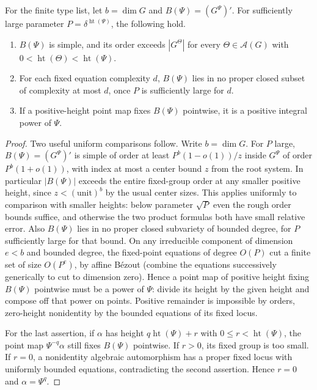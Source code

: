 \begin{lemma}\label{w:height-rigidity}
For the finite type list, let $b=\dim G$ and $B(\Psi)=(G^\Psi)'$. For sufficiently large parameter $P=\delta^{\operatorname{ht}(\Psi)}$, the following hold.
\begin{enumerate}
\item $B(\Psi)$ is simple, and its order exceeds $|G^\Theta|$ for every $\Theta\in\mathcal A(G)$ with $0<\operatorname{ht}(\Theta)<\operatorname{ht}(\Psi)$.
\item For each fixed equation complexity $d$, $B(\Psi)$ lies in no proper closed subset of complexity at most $d$, once $P$ is sufficiently large for $d$.
\item If a positive-height point map fixes $B(\Psi)$ pointwise, it is a positive integral power of $\Psi$.
\end{enumerate}
\end{lemma}
\begin{proof}
Two useful uniform comparisons follow. Write \(b=\dim G\). For \(P\) large, \(B(\Psi)=(G^\Psi)'\) is simple of order at least \(P^b(1-o(1))/z\) inside \(G^\Psi\) of order \(P^b(1+o(1))\), with index at most a center bound \(z\) from the root system. In particular \(|B(\Psi)|\) exceeds the entire fixed-group order at any smaller positive height, since \(z<(\text{unit})^b\) by the usual center sizes. This applies uniformly to comparison with smaller heights: below parameter \(\sqrt P\) even the rough order bounds suffice, and otherwise the two product formulas both have small relative error. Also \(B(\Psi)\) lies in no proper closed subvariety of bounded degree, for \(P\) sufficiently large for that bound. On any irreducible component of dimension \(e<b\) and bounded degree, the fixed-point equations of degree \(O(P)\) cut a finite set of size \(O(P^e)\), by affine B\'ezout (combine the equations successively generically to cut to dimension zero). Hence a point map of positive height fixing \(B(\Psi)\) pointwise must be a power of \(\Psi\): divide its height by the given height and compose off that power on points. Positive remainder is impossible by orders, zero-height nonidentity by the bounded equations of its fixed locus.

For the last assertion, if $\alpha$ has height $q\operatorname{ht}(\Psi)+r$ with $0\le r<\operatorname{ht}(\Psi)$, the point map $\Psi^{-q}\alpha$ still fixes $B(\Psi)$ pointwise. If $r>0$, its fixed group is too small. If $r=0$, a nonidentity algebraic automorphism has a proper fixed locus with uniformly bounded equations, contradicting the second assertion. Hence $r=0$ and $\alpha=\Psi^q$.
\end{proof}

